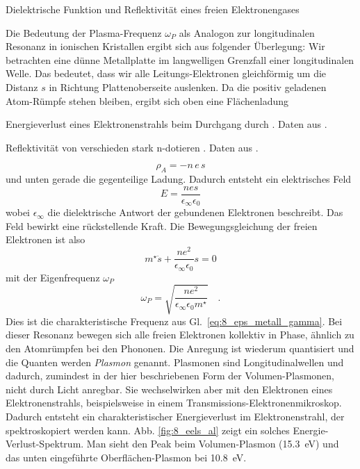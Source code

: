 \begin{marginfigure}[-60mm]
    \caption{Dielektrische Funktion und Reflektivität eines freien Elektronengases}
\end{marginfigure}
    



Die Bedeutung der Plasma-Frequenz $\omega_P$ als Analogon zur longitudinalen Resonanz in ionischen Kristallen ergibt sich aus folgender Überlegung: Wir betrachten eine dünne Metallplatte im langwelligen Grenzfall einer longitudinalen Welle. Das bedeutet, dass wir alle Leitungs-Elektronen gleichförmig um die Distanz $s$ in Richtung Plattenoberseite  auslenken. Da die positiv geladenen Atom-Rümpfe stehen bleiben, ergibt sich oben eine Flächenladung
%
\begin{marginfigure}
    \caption{Energieverlust eines Elektronenstrahls beim Durchgang durch . Daten aus \cite{Powell1959}. 
    \label{fig:8_eels_al} }
\end{marginfigure}
%
\begin{marginfigure}
    \caption{Reflektivität von verschieden stark n-dotieren . Daten aus \cite{Spitzer1957}.
    \label{fig:8_insb_plasmon} } 
\end{marginfigure}
%
\begin{equation}
    \rho_A = - n \, e \, s
\end{equation}
und unten gerade die gegenteilige Ladung. Dadurch entsteht ein elektrisches Feld 
\begin{equation}
    E = \frac{n e s}{\epsilon_\infty \epsilon_0}
\end{equation}
wobei $\epsilon_\infty$ die dielektrische Antwort der gebundenen Elektronen beschreibt. Das Feld bewirkt eine rückstellende Kraft. Die Bewegungsgleichung der freien Elektronen ist also
\begin{equation}
    m^\star \ddot{s} +  \frac{n e^2}{\epsilon_\infty \epsilon_0} s = 0
\end{equation}
mit der Eigenfrequenz $\omega_P$
\begin{equation}
    \omega_P = \sqrt{\frac{n e^2}{\epsilon_\infty \epsilon_0 m^\star}} \quad .
\end{equation}
Dies ist die charakteristische Frequenz aus Gl.~\ref{eq:8_eps_metall_gamma}. Bei dieser Resonanz bewegen sich alle freien Elektronen kollektiv in Phase, ähnlich zu den Atomrümpfen bei den Phononen. Die Anregung ist wiederum quantisiert und die Quanten werden \emph{Plasmon} genannt. Plasmonen sind Longitudinalwellen und dadurch, zumindest in der hier beschriebenen Form der Volumen-Plasmonen, nicht durch Licht anregbar. Sie wechselwirken aber mit den Elektronen eines Elektronenstrahls, beispielsweise in einem Transmissions-Elektronenmikroskop. Dadurch entsteht ein charakteristischer Energieverlust im Elektronenstrahl, der spektroskopiert werden kann. Abb. \ref{fig:8_eels_al} zeigt ein solches Energie-Verlust-Spektrum. Man sieht den Peak beim Volumen-Plasmon (15.3~eV) und das unten eingeführte Oberflächen-Plasmon bei 10.8~eV.

